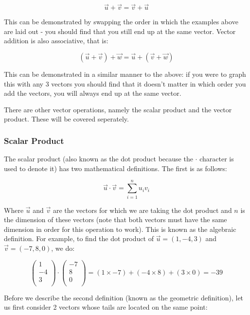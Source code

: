 \documentclass[a4paper,oneside]{report}
\begin{document}
\[ \overrightarrow{u} + \overrightarrow{v} = \overrightarrow{v} +
\overrightarrow{u} \]

This can be demonstrated by swapping the order in which the examples above
are laid out - you should find that you still end up at the same vector.
Vector addition is also associative, that is:

\[ (\overrightarrow{u} + \overrightarrow{v}) + \overrightarrow{w} =
\overrightarrow{u} + (\overrightarrow{v} + \overrightarrow{w}) \]

This can be demonstrated in a similar manner to the above: if you were
to graph this with any 3 vectors you should find that it doesn't matter
in which order you add the vectors, you will always end up at the same
vector.

There are other vector operations, namely the scalar product and the vector
product. These will be covered seperately.

\subsubsection{Scalar Product}

The scalar product (also known as the dot product because the \( \cdot \)
character is used to denote it) has two mathematical definitions. The first
is as follows:

\[ \overrightarrow{u} \cdot \overrightarrow{v} = \displaystyle\sum_{i=1}^{n}
u_i v_i \]

Where \( \overrightarrow{u} \) and \( \overrightarrow{v} \) are the vectors
for which we are taking the dot product and \( n \) is the dimension of these
vectors (note that both vectors must have the same dimension in order for this
operation to work). This is known as the algebraic definition. For example,
to find the dot product of \( \overrightarrow{u} = (1, -4, 3) \) and
\( \overrightarrow{v} = (-7, 8, 0) \), we do:

\[ \begin{pmatrix}
	1 \\
	-4 \\
	3 \\
\end{pmatrix} \cdot \begin{pmatrix}
	-7 \\
	8 \\
	0 \\
\end{pmatrix} = (1 \times -7) + (-4 \times 8) + (3 \times 0) = -39 \]


Before we describe the second definition (known as the geometric definition),
let us first consider 2 vectors whose tails are located on the same point:
\end{document}
